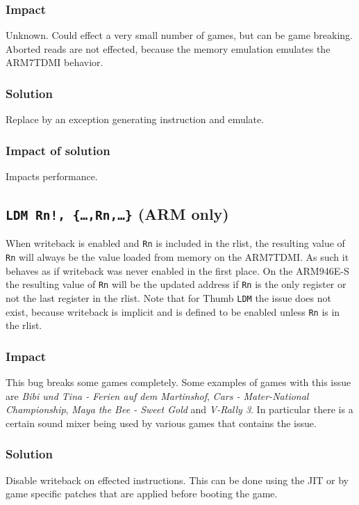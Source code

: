\documentclass[a4paper,10pt]{report}
\begin{document}
		\subsubsection{Impact}
		Unknown. Could effect a very small number of games, but can be game breaking. Aborted reads are not effected, because the memory emulation emulates the ARM7TDMI behavior.
		
		\subsubsection{Solution}
		Replace by an exception generating instruction and emulate.
		
		\subsubsection{Impact of solution}
		Impacts performance.
		
	\subsection{\texttt{LDM Rn!, \{\dots,Rn,\dots\}} (ARM only)}
		When writeback is enabled and \texttt{Rn} is included in the rlist, the resulting value of \texttt{Rn} will always be the value loaded from memory on the ARM7TDMI. As such it behaves as if writeback was never enabled in the first place. On the ARM946E-S the resulting value of \texttt{Rn} will be the updated address if \texttt{Rn} is the only register or not the last register in the rlist. Note that for Thumb \texttt{LDM} the issue does not exist, because writeback is implicit and is defined to be enabled unless \texttt{Rn} is in the rlist.
		
		\subsubsection{Impact}
		This bug breaks some games completely. Some examples of games with this issue are \textit{Bibi und Tina - Ferien auf dem Martinshof}, \textit{Cars - Mater-National Championship}, \textit{Maya the Bee - Sweet Gold} and \textit{V-Rally 3}. In particular there is a certain sound mixer being used by various games that contains the issue.
		
		\subsubsection{Solution}
		Disable writeback on effected instructions. This can be done using the JIT or by game specific patches that are applied before booting the game.
		
\end{document}
